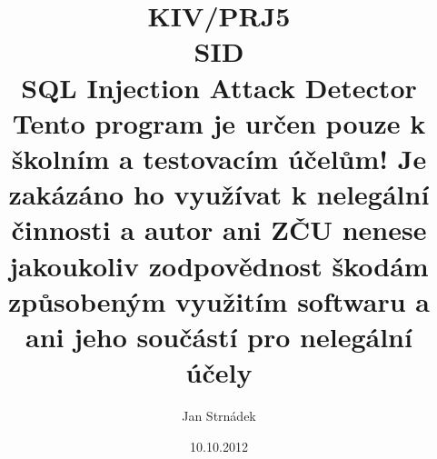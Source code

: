 \documentclass[12pt, a4paper]{report}
\begin{document}
\author{Jan Strnádek}
\date{10.10.2012}
\title{KIV/PRJ5\\SID\\\small{SQL Injection Attack Detector\\Tento program je určen pouze k školním a testovacím účelům! Je zakázáno ho využívat k nelegální činnosti a autor ani ZČU nenese jakoukoliv zodpovědnost škodám způsobeným využitím softwaru a ani jeho součástí pro nelegální účely}}



\tableofcontents
\newpage


\newpage














\end{document}
